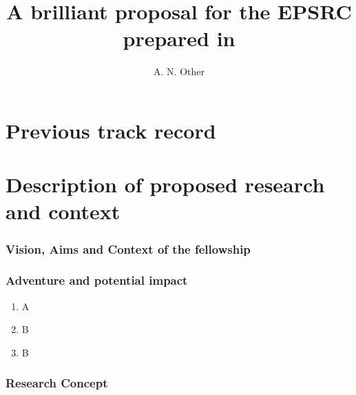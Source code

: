 \documentclass{epsrc}
\begin{document}
\listoftodos%
\newpage%
\title{A brilliant proposal for the EPSRC prepared in \LaTeXe}
\author{A. N. Other}
\maketitle

\part{Previous track record}
\lipsum[1-5]\citeA{}
\lipsum[6-14]

\newpage

\part{Description of proposed research and context}

\section{Vision, Aims and Context of the fellowship}

\lipsum[15-16]

\section{Adventure and potential impact}

\lipsum[17-18]

\begin{enumerate}[label=\roman*.]
	\item A
	\item B
	\item B
\end{enumerate}

\section{Research Concept}
\end{document}
